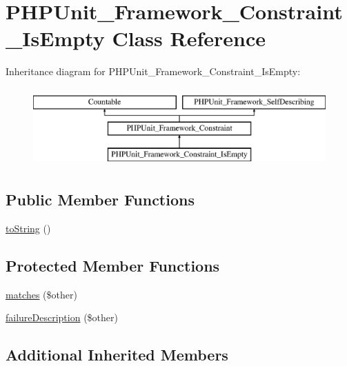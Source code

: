 \hypertarget{class_p_h_p_unit___framework___constraint___is_empty}{}\section{P\+H\+P\+Unit\+\_\+\+Framework\+\_\+\+Constraint\+\_\+\+Is\+Empty Class Reference}
\label{class_p_h_p_unit___framework___constraint___is_empty}
Inheritance diagram for P\+H\+P\+Unit\+\_\+\+Framework\+\_\+\+Constraint\+\_\+\+Is\+Empty\+:\begin{figure}[H]
\begin{center}
\leavevmode
\includegraphics[height=3.000000cm]{class_p_h_p_unit___framework___constraint___is_empty}
\end{center}
\end{figure}
\subsection*{Public Member Functions}
\begin{DoxyCompactItemize}
\item 
\mbox{\hyperlink{class_p_h_p_unit___framework___constraint___is_empty_a5558c5d549f41597377fa1ea8a1cefa3}{to\+String}} ()
\end{DoxyCompactItemize}
\subsection*{Protected Member Functions}
\begin{DoxyCompactItemize}
\item 
\mbox{\hyperlink{class_p_h_p_unit___framework___constraint___is_empty_a9c9c337de483bbdbb9fa249a6c7c9cc5}{matches}} (\$other)
\item 
\mbox{\hyperlink{class_p_h_p_unit___framework___constraint___is_empty_aaabb679273bfb812df4d81c283754a59}{failure\+Description}} (\$other)
\end{DoxyCompactItemize}
\subsection*{Additional Inherited Members}


